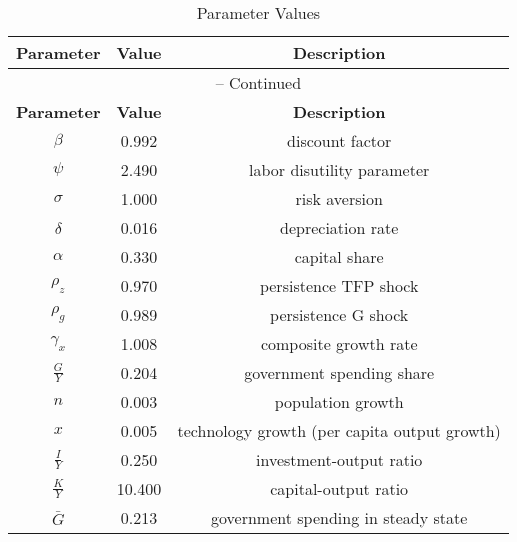 \begin{center}
\begin{longtable}{ccc}
\caption{Parameter Values}\\%
\toprule%
\multicolumn{1}{c}{\textbf{Parameter}} &
\multicolumn{1}{c}{\textbf{Value}} &
 \multicolumn{1}{c}{\textbf{Description}}\\%
\midrule%
\endfirsthead
\multicolumn{3}{c}{{\tablename} \thetable{} -- Continued}\\%
\midrule%
\multicolumn{1}{c}{\textbf{Parameter}} &
\multicolumn{1}{c}{\textbf{Value}} &
  \multicolumn{1}{c}{\textbf{Description}}\\%
\midrule%
\endhead
${\beta}$ 	 & 	 0.992 	 & 	 discount factor\\
${\psi}$ 	 & 	 2.490 	 & 	 labor disutility parameter\\
${\sigma}$ 	 & 	 1.000 	 & 	 risk aversion\\
${\delta}$ 	 & 	 0.016 	 & 	 depreciation rate\\
${\alpha}$ 	 & 	 0.330 	 & 	 capital share\\
${\rho_z}$ 	 & 	 0.970 	 & 	 persistence TFP shock\\
${\rho_g}$ 	 & 	 0.989 	 & 	 persistence G shock\\
${\gamma_x}$ 	 & 	 1.008 	 & 	 composite growth rate\\
${\frac{G}{Y}}$ 	 & 	 0.204 	 & 	 government spending share\\
${n}$ 	 & 	 0.003 	 & 	 population growth\\
${x}$ 	 & 	 0.005 	 & 	 technology growth (per capita output growth)\\
${\frac{I}{Y}}$ 	 & 	 0.250 	 & 	 investment-output ratio\\
${\frac{K}{Y}}$ 	 & 	 10.400 	 & 	 capital-output ratio\\
${\bar G}$ 	 & 	 0.213 	 & 	 government spending in steady state\\
\bottomrule%
\end{longtable}
\end{center}
